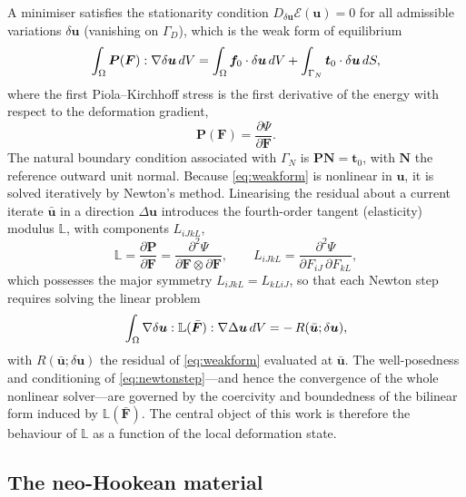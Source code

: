 A minimiser satisfies the stationarity condition $D_{\delta \bm{u}}\mathcal{E}(\bm{u}) = 0$ for all admissible
variations $\delta \bm{u}$ (vanishing on $\Gamma_D$), which is the weak form of equilibrium
\begin{equation}
    \label{eq:weakform}
    \int_\Omega \bm{P}(\bm{F}) : \nabla \delta \bm{u} \,dV
    = \int_\Omega \bm{f}_0 \cdot \delta \bm{u} \,dV + \int_{\Gamma_N} \bm{t}_0 \cdot \delta \bm{u} \,dS,
\end{equation}
where the first Piola--Kirchhoff stress is the first derivative of the energy with respect to the deformation
gradient,
\begin{equation}
    \bm{P}(\bm{F}) = \frac{\partial \Psi}{\partial \bm{F}}.
\end{equation}
The natural boundary condition associated with $\Gamma_N$ is $\bm{P} \bm{N} = \bm{t}_0$, with $\bm{N}$ the reference
outward unit normal. Because \eqref{eq:weakform} is nonlinear in $\bm{u}$, it is solved iteratively by Newton's method.
Linearising the residual about a current iterate $\bar{\bm{u}}$ in a direction $\Delta \bm{u}$ introduces the
fourth-order tangent (elasticity) modulus $\mathbb{L}$, with components $L_{iJkL}$,
\begin{equation}
    \label{eq:tangentdef}
    \mathbb{L} = \frac{\partial \bm{P}}{\partial \bm{F}} = \frac{\partial^2 \Psi}{\partial \bm{F} \otimes \partial \bm{F}},
    \qquad L_{iJkL} = \frac{\partial^2 \Psi}{\partial F_{iJ}\,\partial F_{kL}},
\end{equation}
which possesses the major symmetry $L_{iJkL} = L_{kLiJ}$, so that each Newton step requires solving the linear problem
\begin{equation}
    \label{eq:newtonstep}
    \int_\Omega \nabla \delta \bm{u} : \mathbb{L}(\bar{\bm{F}}) : \nabla \Delta \bm{u} \,dV = -\,R(\bar{\bm{u}}; \delta \bm{u}),
\end{equation}
with $R(\bar{\bm{u}}; \delta \bm{u})$ the residual of \eqref{eq:weakform} evaluated at $\bar{\bm{u}}$. The well-posedness
and conditioning of \eqref{eq:newtonstep}---and hence the convergence of the whole nonlinear solver---are governed by
the coercivity and boundedness of the bilinear form induced by $\mathbb{L}(\bar{\bm{F}})$. The central object of this
work is therefore the behaviour of $\mathbb{L}$ as a function of the local deformation state.

\subsection{The neo-Hookean material}

